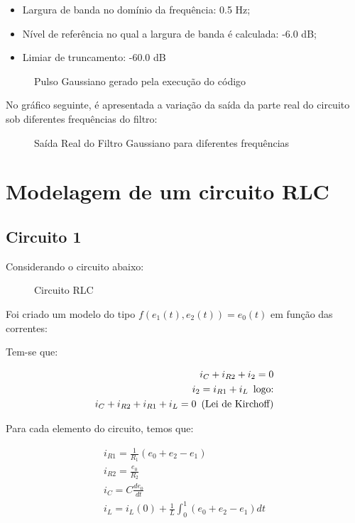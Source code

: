 \documentclass[fleqn, 11pt]{article}
\begin{document}
\begin{itemize}
\item Largura de banda no domínio da frequência: 0.5 Hz;
\item Nível de referência no qual a largura de banda é calculada: -6.0 dB;
\item Limiar de truncamento: -60.0 dB
\end{itemize}

\begin{figure}[H]
\label{figure:pulsoGaussiano}
   \caption{Pulso Gaussiano gerado pela execução do código}
\end{figure}

No gráfico seguinte, é apresentada a variação da saída da parte real do circuito sob diferentes frequências do filtro:

\begin{figure}[H]
\label{figure:pulsoGaussiano}
   \caption{Saída Real do Filtro Gaussiano para diferentes frequências}
\end{figure}
\newpage
\section{Modelagem de um circuito RLC}
\subsection{Circuito 1}
Considerando o circuito abaixo:

\begin{figure}[H]
\label{figure:circuito_1}
   \caption{Circuito RLC}
\end{figure}

Foi criado um modelo do tipo $f(e_1(t),e_2(t)) = e_0(t)$ em função das correntes:

Tem-se que:

\begin{align*}
i_C + i_{R2} + i_2 = 0 \\
i_2 = i_{R1} + i_L \text{\phantom{0}logo:} \\
i_C + i_{R2} + i_{R1} + i_{L} = 0 \text{\phantom{0}(Lei de Kirchoff)}
\end{align*}

Para cada elemento do circuito, temos que:

\begin{align*}
i_{R1} = \frac{1}{R_1} (e_0 + e_2 - e_1) \\
i_{R2} = \frac{e_0}{R_2} \\
i_C = C \frac{de_0}{dt} \\
i_L = i_L(0) + \frac{1}{L} \int_{0}^{1} (e_0 + e_2 - e_1) dt
\end{align*}
\end{document}
